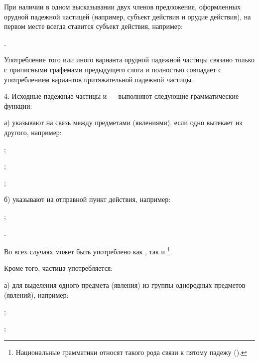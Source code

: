 При наличии в одном высказывании двух членов предложения, оформленных орудной падежной частицей (например, субъект действия и орудие действия), на первом месте всегда ставится субъект действия, например:
\begin{prfsample}
	\item {}.
\end{prfsample}

Употребление того или иного варианта орудной падежной частицы связано только с приписными графемами предыдущего слога и полностью совпадает с употреблением вариантов притяжательной падежной частицы.

4. Исходные падежные частицы  и  --- выполняют следующие грамматические функции:

а) указывают на связь между предметами (явлениями), если одно вытекает из другого, например:
\begin{prfsample}
	\item {};
	\item {};
	\item {};
\end{prfsample}

б) указывают на отправной пункт действия, например:
\begin{prfsample}
	\item {};
	\item {}.
\end{prfsample}

Во всех случаях может быть употреблено как , так и \footnote[48]{Национальные грамматики относят такого рода связи к пятому падежу ().}.

Кроме того, частица  употребляется:

а) для выделения одного предмета (явления) из группы однородных предметов (явлений), например:
\begin{prfsample}
	\item {};
	\item {};
\end{prfsample}


